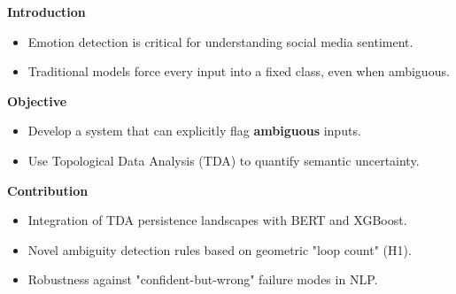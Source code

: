 \textbf{Introduction}
\begin{itemize}
    \item Emotion detection is critical for understanding social media sentiment.
    \item Traditional models force every input into a fixed class, even when ambiguous.
\end{itemize}

\vspace{0.3cm}
\textbf{Objective}
\begin{itemize}
    \item Develop a system that can explicitly flag \textbf{ambiguous} inputs.
    \item Use Topological Data Analysis (TDA) to quantify semantic uncertainty.
\end{itemize}

\vspace{0.3cm}
\textbf{Contribution}
\begin{itemize}
    \item Integration of TDA persistence landscapes with BERT and XGBoost.
    \item Novel ambiguity detection rules based on geometric "loop count" (H1).
    \item Robustness against "confident-but-wrong" failure modes in NLP.
\end{itemize}
